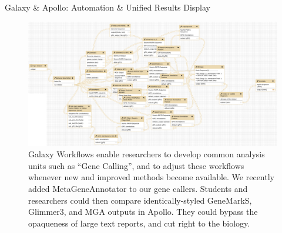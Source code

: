 \documentclass[final,t]{beamer}
\begin{document}
\begin{frame}[fragile]
\begin{columns}[t]
\begin{column}{.60\linewidth}
\begin{block}{Galaxy \& Apollo: Automation \& Unified Results Display }
                \begin{figure}
                    \includegraphics[width=\textwidth]{./media/workflow.png}
                    \caption{Galaxy Workflows enable researchers to develop
                    common analysis units such as ``Gene Calling'', and to
                    adjust these workflows whenever new and improved methods
                    become available. We recently added MetaGeneAnnotator to our
                    gene callers. Students and researchers could then
                    compare identically-styled GeneMarkS, Glimmer3, and MGA
                    outputs in Apollo. They could bypass the opaqueness of
                    large text reports, and cut right to the biology.}
                    \vspace{-0.3cm}
                \end{figure}
            \end{block}
        \end{column}
  \end{columns}
\end{frame}
\end{document}
